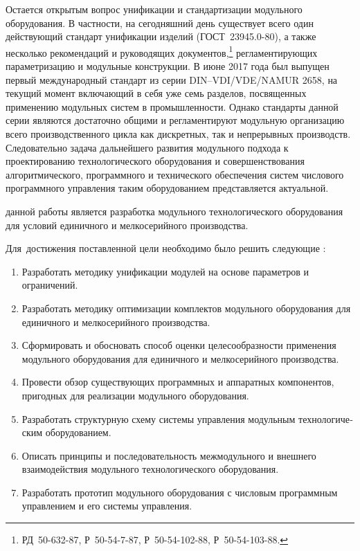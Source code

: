 Остается открытым вопрос унификации и стандартизации модульного оборудования. В частности, на сегодняшний день существует всего один действующий стандарт унификации изделий (ГОСТ~23945.0-80), а также несколько рекомендаций и руководящих документов,\footnote{РД~50-632-87, Р~50-54-7-87, Р~50-54-102-88, Р~50-54-103-88.} регламентирующих параметризацию и модульные конструкции. В июне 2017 года был выпущен первый международный стандарт из серии DIN--VDI/VDE/NAMUR 2658, на текущий момент включающий в себя уже семь разделов, посвященных применению модульных систем в промышленности. Однако стандарты данной серии являются достаточно общими и регламентируют модульную организацию всего производственного цикла как дискретных, так и непрерывных производств. Следовательно задача дальнейшего развития модульного подхода к проектированию технологического оборудования и совершенствования алгоритмического, программного и технического обеспечения систем числового программного управления таким оборудованием представляется актуальной.  


{\aim} данной работы является разработка модульного технологического оборудования для условий единичного и мелкосерийного производства.

Для~достижения поставленной цели необходимо было решить следующие {\tasks}:
\begin{enumerate}[beginpenalty=10000] %
\item Разработать методику унификации модулей на основе параметров и ограничений.
\item Разработать методику оптимизации комплектов  модульного оборудо­вания для единичного и мелкосерийного производства.
\item Сформировать и обосновать способ оценки целесообразности примене­ния модульного оборудования для единичного и мелкосерийного производства.
\item Провести обзор существующих программных и аппаратных компонен­тов, пригодных для реализации модульного оборудования. 
\item Разработать структурную схему системы управления модульным технологиче­ским оборудованием.
\item Описать принципы и последовательность межмодульного и внешнего взаимодействия модуль­ного технологического оборудования.
\item Разработать прототип модульного оборудования с числовым программным управлением и его системы управле­ния.
\end{enumerate}

